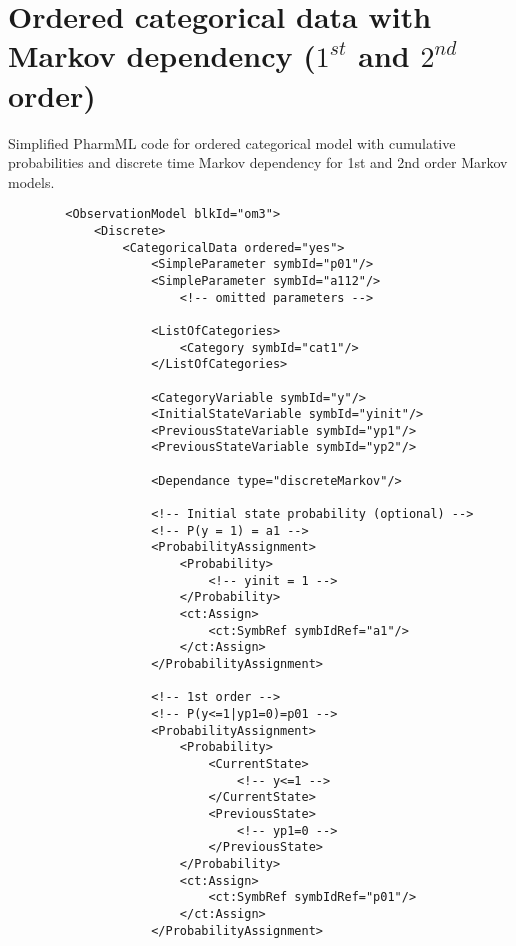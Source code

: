\section{Ordered categorical data with Markov dependency ($1^{st}$ and $2^{nd}$ order)}
Simplified PharmML code for ordered categorical model with cumulative probabilities 
and discrete time Markov dependency for 1st and 2nd order Markov models.
\lstset{language=XML}
\begin{lstlisting}
        <ObservationModel blkId="om3">
            <Discrete>
                <CategoricalData ordered="yes">
                    <SimpleParameter symbId="p01"/>
                    <SimpleParameter symbId="a112"/>
                        <!-- omitted parameters -->
                    
                    <ListOfCategories>
                        <Category symbId="cat1"/>
                    </ListOfCategories>
                    
                    <CategoryVariable symbId="y"/>
                    <InitialStateVariable symbId="yinit"/>
                    <PreviousStateVariable symbId="yp1"/>
                    <PreviousStateVariable symbId="yp2"/>
                    
                    <Dependance type="discreteMarkov"/>
                    
                    <!-- Initial state probability (optional) -->
                    <!-- P(y = 1) = a1 -->
                    <ProbabilityAssignment>
                        <Probability>
                            <!-- yinit = 1 -->
                        </Probability>
                        <ct:Assign>
                            <ct:SymbRef symbIdRef="a1"/>
                        </ct:Assign>
                    </ProbabilityAssignment>
                    
                    <!-- 1st order -->
                    <!-- P(y<=1|yp1=0)=p01 -->
                    <ProbabilityAssignment>
                        <Probability>
                            <CurrentState>
                                <!-- y<=1 -->
                            </CurrentState>
                            <PreviousState>
                                <!-- yp1=0 -->
                            </PreviousState>
                        </Probability>
                        <ct:Assign>
                            <ct:SymbRef symbIdRef="p01"/>
                        </ct:Assign>
                    </ProbabilityAssignment>
                    

\end{lstlisting}

